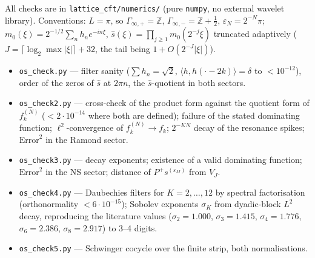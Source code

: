 \documentclass[11pt,a4paper]{article}
\theoremstyle{definition}
\newcommand{\eps}{\varepsilon}
\newcommand{\sh}{\hat{s}}
\begin{document}
\noindent
All checks are in \texttt{lattice\_cft/numerics/} (pure \texttt{numpy}, no external wavelet
library). Conventions: $L=\pi$, so $\Gamma_{\infty,+}=\mathbb Z$,
$\Gamma_{\infty,-}=\mathbb Z+\tfrac12$, $\eps_N=2^{-N}\pi$;
$m_0(\xi)=2^{-1/2}\sum_nh_ne^{-in\xi}$, $\sh(\xi)=\prod_{j\ge1}m_0(2^{-j}\xi)$ truncated
adaptively ($J=\lceil\log_2\max|\xi|\rceil+32$, the tail being $1+O(2^{-J}|\xi|)$).

\begin{itemize}[leftmargin=1.4em,itemsep=1pt]
\item \texttt{os\_check.py} --- filter sanity ($\sum h_n=\sqrt2$, $\langle h,h(\cdot-2k)\rangle=\delta$
to $<10^{-12}$), order of the zeros of $\sh$ at $2\pi n$, the $\sh$-quotient in both sectors.
\item \texttt{os\_check2.py} --- cross-check of the product form against the quotient form of
$f^{(N)}_k$ ($<2\cdot10^{-14}$ where both are defined); failure of the stated dominating
function; $\ell^2$-convergence of $f^{(N)}_k\to f_k$; $2^{-KN}$ decay of the resonance spikes;
$\mathrm{Error}^2$ in the Ramond sector.
\item \texttt{os\_check3.py} --- decay exponents; existence of a valid dominating function;
$\mathrm{Error}^2$ in the NS sector; distance of $P^+\!s^{(\eps_M)}$ from $V_J$.
\item \texttt{os\_check4.py} --- Daubechies filters for $K=2,\dots,12$ by spectral factorisation
(orthonormality $<6\cdot10^{-15}$); Sobolev exponents $\sigma_K$ from dyadic-block $L^2$ decay,
reproducing the literature values ($\sigma_2=1.000$, $\sigma_3=1.415$, $\sigma_4=1.776$,
$\sigma_6=2.386$, $\sigma_8=2.917$) to 3--4 digits.
\item \texttt{os\_check5.py} --- Schwinger cocycle over the finite strip, both normalisations.
\end{itemize}
\end{document}
